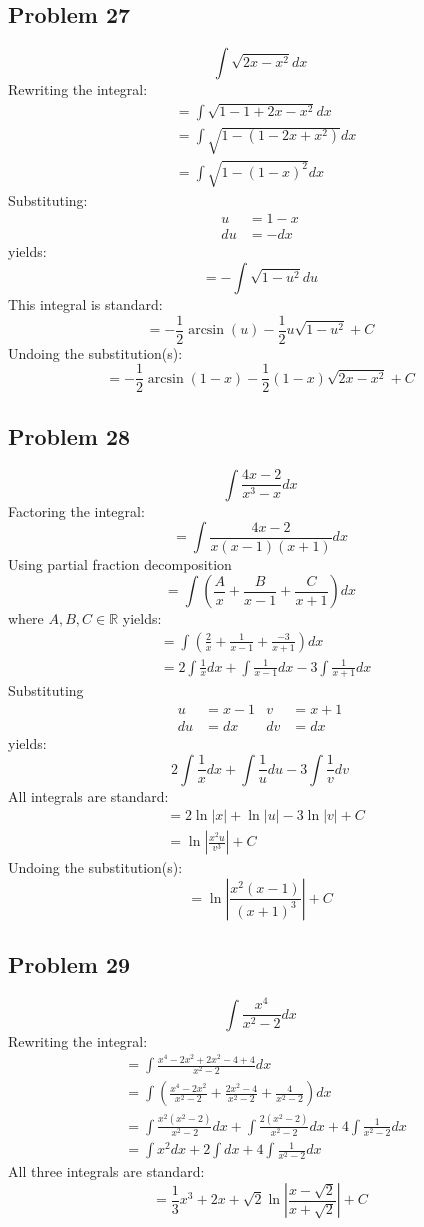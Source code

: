 \documentclass{article}
\begin{document}
\subsection*{Problem 27}
$$\int\sqrt{2x-x^2}dx$$
Rewriting the integral:
\begin{align*}
&=\int\sqrt{1-1+2x-x^2}dx \\
&=\int\sqrt{1-(1-2x+x^2)}dx \\
&=\int\sqrt{1-(1-x)^2}dx
\end{align*}
Substituting:
\begin{align*}
u&=1-x \\
du&=-dx
\end{align*}
yields:
$$=-\int\sqrt{1-u^2}du$$
This integral is standard:
$$=-\frac{1}{2}\arcsin(u)-\frac{1}{2}u\sqrt{1-u^2}+C$$
Undoing the substitution(s):
$$=-\frac{1}{2}\arcsin(1-x)-\frac{1}{2}(1-x)\sqrt{2x-x^2}+C$$
\subsection*{Problem 28}
$$\int\frac{4x-2}{x^3-x}dx$$
Factoring the integral:
$$=\int\frac{4x-2}{x(x-1)(x+1)}dx$$
Using partial fraction decomposition
$$=\int\left(\frac{A}{x}+\frac{B}{x-1}+\frac{C}{x+1}\right)dx$$
where $A,B,C\in\mathbb{R}$ yields:
\begin{align*}
&=\int\left(\frac{2}{x}+\frac{1}{x-1}+\frac{-3}{x+1}\right)dx \\
&=2\int\frac{1}{x}dx+\int\frac{1}{x-1}dx-3\int\frac{1}{x+1}dx
\end{align*}
Substituting
\begin{align*}
u&=x-1 &v&=x+1 \\
du&=dx &dv&=dx
\end{align*}
yields:
$$2\int\frac{1}{x}dx+\int\frac{1}{u}du-3\int\frac{1}{v}dv$$
All integrals are standard:
\begin{align*}
&=2\ln|x|+\ln|u|-3\ln|v|+C \\
&=\ln\left|\frac{x^2u}{v^3}\right|+C
\end{align*}
Undoing the substitution(s):
$$=\ln\left|\frac{x^2(x-1)}{(x+1)^3}\right|+C$$
\subsection*{Problem 29}
$$\int\frac{x^4}{x^2-2}dx$$
Rewriting the integral:
\begin{align*}
&=\int\frac{x^4-2x^2+2x^2-4+4}{x^2-2}dx \\
&=\int\left(\frac{x^4-2x^2}{x^2-2}+\frac{2x^2-4}{x^2-2}+\frac{4}{x^2-2}\right)dx \\
&=\int\frac{x^2(x^2-2)}{x^2-2}dx+\int\frac{2(x^2-2)}{x^2-2}dx+4\int\frac{1}{x^2-2}dx \\
&=\int x^2dx+2\int dx+4\int\frac{1}{x^2-2}dx
\end{align*}
All three integrals are standard:
$$=\frac{1}{3}x^3+2x+\sqrt{2}\ln\left|\frac{x-\sqrt{2}}{x+\sqrt{2}}\right|+C$$
\end{document}
